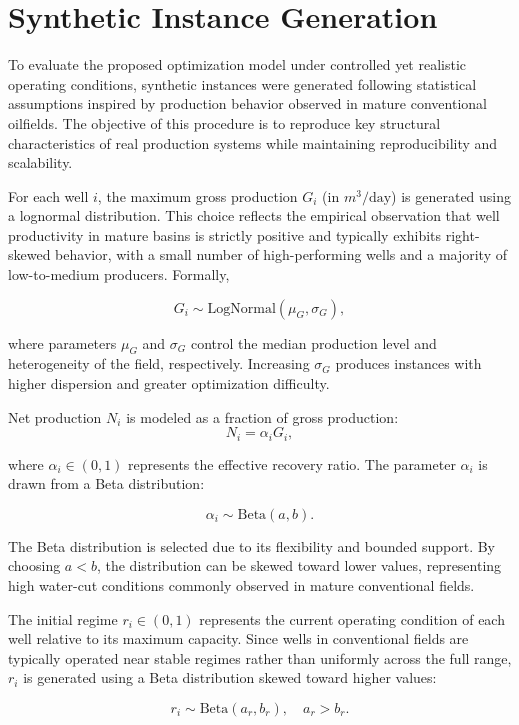 \section{Synthetic Instance Generation} \label{sec:instances}

To evaluate the proposed optimization model under controlled yet realistic operating conditions, synthetic instances were generated following statistical assumptions inspired by production behavior observed in mature conventional oilfields. The objective of this procedure is to reproduce key structural characteristics of real production systems while maintaining reproducibility and scalability.

For each well $i$, the maximum gross production $G_i$ (in $m^3/\text{day}$) is generated using a lognormal distribution. This choice reflects the empirical observation that well productivity in mature basins is strictly positive and typically exhibits right-skewed behavior, with a small number of high-performing wells and a majority of low-to-medium producers. Formally,

\[
G_i \sim \text{LogNormal}(\mu_G, \sigma_G),
\]

\noindent where parameters $\mu_G$ and $\sigma_G$ control the median production level and heterogeneity of the field, respectively. Increasing $\sigma_G$ produces instances with higher dispersion and greater optimization difficulty.


Net production $N_i$ is modeled as a fraction of gross production:
\[
N_i = \alpha_i G_i,
\]

\noindent where $\alpha_i \in (0,1)$ represents the effective recovery ratio. The parameter $\alpha_i$ is drawn from a Beta distribution:

\[
\alpha_i \sim \text{Beta}(a,b).
\]

The Beta distribution is selected due to its flexibility and bounded support. By choosing $a < b$, the distribution can be skewed toward lower values, representing high water-cut conditions commonly observed in mature conventional fields.


The initial regime $r_i \in (0,1)$ represents the current operating condition of each well relative to its maximum capacity. Since wells in conventional fields are typically operated near stable regimes rather than uniformly across the full range, $r_i$ is generated using a Beta distribution skewed toward higher values:

\[
r_i \sim \text{Beta}(a_r, b_r), \quad a_r > b_r.
\]

